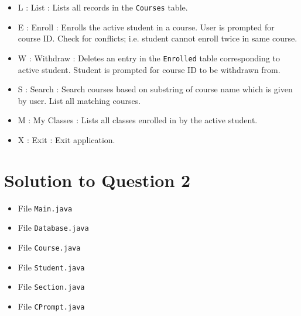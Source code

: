 \begin{itemize}
\item[] L : List : Lists all records in the \texttt{Courses} table.
\item[] E : Enroll : Enrolls the active student in a course.
User is prompted for course ID. Check for conflicts; i.e. student cannot enroll twice in same course.
\item[] W : Withdraw : Deletes an entry in the \texttt{Enrolled} table corresponding to active student. Student is prompted for course ID to be withdrawn from.
\item[] S : Search : Search courses based on substring of course name which is given by user. List all matching courses.
\item[] M : My Classes : Lists all classes enrolled in by the active student.
\item[] X : Exit : Exit application.
\end{itemize}

\section*{Solution to Question 2}

\lstset{language=java}
\lstset{tabsize=2}
\begin{itemize}

\item File \texttt{Main.java}


\item File \texttt{Database.java}


\item File \texttt{Course.java}


\item File \texttt{Student.java}


\item File \texttt{Section.java}


\item File \texttt{CPrompt.java}


\end{itemize}
